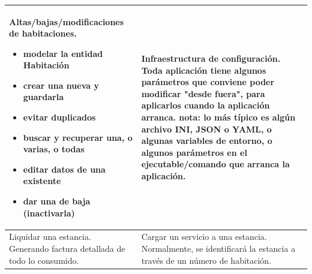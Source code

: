 \documentclass[spanish,12pt,a4paper,final,oneside]{book}
\begin{document}
\def\arraystretch{2}
\begin{longtable}{|p{7cm}|p{7cm}|}

\hline

Altas/bajas/modificaciones de habitaciones. 
\newline
\begin{itemize}
\item modelar la entidad Habitación
\item crear una nueva y guardarla
\item evitar duplicados 
\item buscar y recuperar una, o varias, o todas
\item editar datos de una existente
\item dar una de baja (inactivarla)
\end{itemize}

&

Infraestructura de configuración.
\newline \newline
Toda aplicación tiene algunos parámetros que conviene poder modificar "desde fuera", para aplicarlos cuando la aplicación arranca.
\newline \newline
nota: lo más típico es algún archivo INI, JSON o YAML,
o algunas variables de entorno,
o algunos parámetros en el ejecutable/comando que arranca la aplicación.

\\ \hline

Liquidar una estancia.
\newline \newline
Generando factura detallada de todo lo consumido.

&

Cargar un servicio a una estancia.
\newline \newline
Normalmente, se identificará la estancia a través de un número de habitación.

\\ \hline


\end{longtable}
\end{document}
